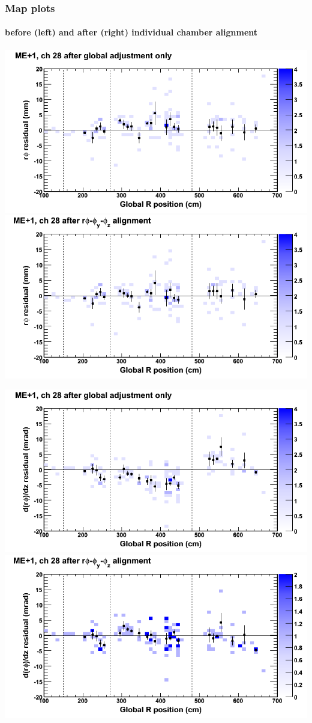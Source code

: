 \documentclass[compress]{beamer}
\begin{document}
\begin{frame}
\frametitle{Map plots}
\framesubtitle{before (left) and after (right) individual chamber alignment}
\includegraphics[width=0.5\linewidth]{ringmapplots_3dof/before_CSCvsr_mep1ch28_x.png} \includegraphics[width=0.5\linewidth]{ringmapplots_3dof/after_CSCvsr_mep1ch28_x.png}

\includegraphics[width=0.5\linewidth]{ringmapplots_3dof/before_CSCvsr_mep1ch28_dxdz.png} \includegraphics[width=0.5\linewidth]{ringmapplots_3dof/after_CSCvsr_mep1ch28_dxdz.png}
\end{frame}
\end{document}
